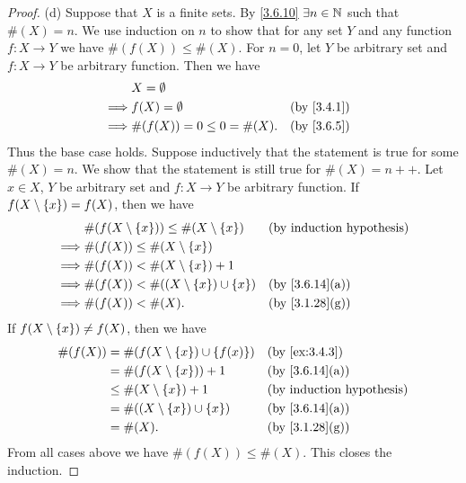 \begin{proof}{(d)}
	Suppose that \(X\) is a finite sets.
	By \cref{3.6.10} \(\exists n \in \mathbb{N}\) such that \(\#(X) = n\).
	We use induction on \(n\) to show that for any set \(Y\) and any function \(f : X \to Y\) we have \(\#(f(X)) \leq \#(X)\).
	For \(n = 0\), let \(Y\) be arbitrary set and \(f : X \to Y\) be arbitrary function.
	Then we have
	\begin{align*}
		         & X = \emptyset                                \\
		\implies & f(X) = \emptyset             &  & \by{3.4.1} \\
		\implies & \#(f(X)) = 0 \leq 0 = \#(X). &  & \by{3.6.5}
	\end{align*}
	Thus the base case holds.
	Suppose inductively that the statement is true for some \(\#(X) = n\).
	We show that the statement is still true for \(\#(X) = n++\).
	Let \(x \in X\), \(Y\) be arbitrary set and \(f : X \to Y\) be arbitrary function.
	If \(f(X \setminus \left\lbrace x\right\rbrace) = f(X)\), then we have
	\begin{align*}
		         & \#(f(X \setminus \set{x})) \leq \#(X \setminus \set{x}) &  & \byIH                        \\
		\implies & \#(f(X)) \leq \#(X \setminus \set{x})                                                     \\
		\implies & \#(f(X)) < \#(X \setminus \set{x}) + 1                                                    \\
		\implies & \#(f(X)) < \#((X \setminus \set{x}) \cup \set{x})       &  & \text{(by \cref{3.6.14}(a))} \\
		\implies & \#(f(X)) < \#(X).                                       &  & \text{(by \cref{3.1.28}(g))}
	\end{align*}
	If \(f(X \setminus \left\lbrace x\right\rbrace) \neq f(X)\), then we have
	\begin{align*}
		\#(f(X)) & = \#(f(X \setminus \set{x}) \cup \set{f(x)}) &  & \by{ex:3.4.3}                \\
		         & = \#(f(X \setminus \set{x})) + 1             &  & \text{(by \cref{3.6.14}(a))} \\
		         & \leq \#(X \setminus \set{x}) + 1             &  & \byIH                        \\
		         & = \#((X \setminus \set{x}) \cup \set{x})     &  & \text{(by \cref{3.6.14}(a))} \\
		         & = \#(X).                                     &  & \text{(by \cref{3.1.28}(g))}
	\end{align*}
	From all cases above we have \(\#(f(X)) \leq \#(X)\).
	This closes the induction.


\end{proof}
